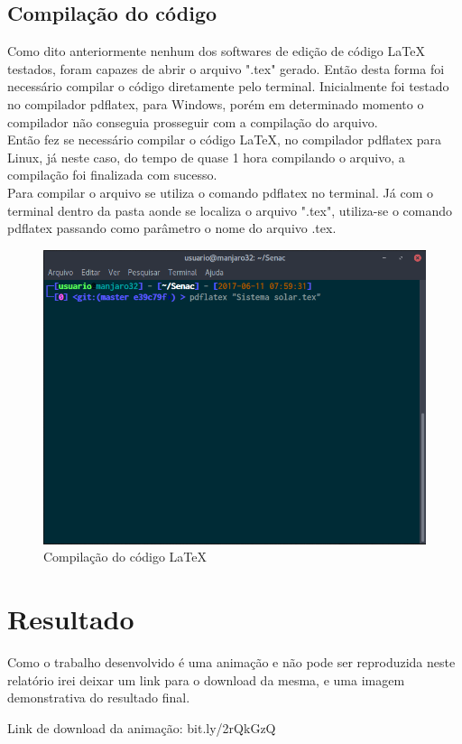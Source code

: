 \documentclass[
	12pt,				%
	openright,			%
	oneside,
	a4paper,			%
	english,			%
	french,				%
	spanish,			%
	brazil,				%
	]{abntex2}
\begin{document}
	
\section{Compilação do código}
	Como dito anteriormente nenhum dos softwares de edição de código LaTeX testados, foram capazes de abrir o arquivo ".tex" gerado. Então desta forma foi necessário compilar o código diretamente pelo terminal. Inicialmente foi testado no compilador pdflatex, para Windows, porém em determinado momento o compilador não conseguia prosseguir com a compilação do arquivo.
	\\ \indent Então fez se necessário compilar o código LaTeX, no compilador pdflatex para Linux, já neste caso, do tempo de quase 1 hora compilando o arquivo, a compilação foi finalizada com sucesso.
 	\\ \indent Para compilar o arquivo se utiliza o comando pdflatex no terminal. Já com o terminal dentro da pasta aonde se localiza o arquivo ".tex", utiliza-se o comando pdflatex passando como parâmetro o nome do arquivo .tex.\\
\begin{figure}[h]
	\centering
	\includegraphics[width=0.5\linewidth]{screenshot003}
	\caption{Compilação do código LaTeX}
	\label{fig:screenshot003}
\end{figure}

	
\chapter[Resultado]{Resultado}
	Como o trabalho desenvolvido é uma animação e não pode ser reproduzida neste relatório irei deixar um link para o download da mesma, e uma imagem demonstrativa do resultado final.
	
	Link de download da animação: bit.ly/2rQkGzQ
	
\end{document}
